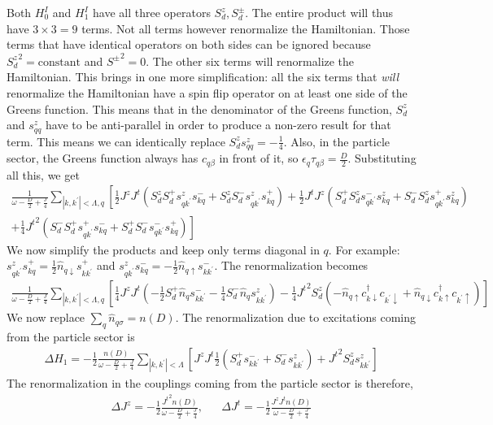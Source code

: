 \documentclass[12pt]{revtex4-2}
\begin{document}
Both \(H^I_0\) and \(H^I_1\) have all three operators \(S_d^z, S_d^\pm\). The entire product will thus have \(3\times 3 = 9\) terms. Not all terms however renormalize the Hamiltonian. Those terms that have identical operators on both sides can be ignored because \({S_d^z}^2 = \text{constant}\) and \({S^\pm}^2 = 0\). The other six terms will renormalize the Hamiltonian. This brings in one more simplification: all the six terms that \textit{will} renormalize the Hamiltonian have a spin flip operator on at least one side of the Greens function. This means that in the denominator of the Greens function, \(S_d^z\) and \(s^z_{qq}\) have to be anti-parallel in order to produce a non-zero result for that term. This means we can identically replace \(S_d^z s^z_{qq} = -\frac{1}{4}\). Also, in the particle sector, the Greens function always has \(c_{q\beta}\) in front of it, so \(\epsilon_q \tau_{q\beta} = \frac{D}{2}\). Substituting all this, we get
\begin{align}
	\frac{1}{\omega - \frac{D}{2} + \frac{J}{4}}\sum_{|k,k^\prime|<\Lambda,q}\left[\frac{1}{2}J^z J^t \left(S_d^z S_d^+ s^z_{qk^\prime}s^-_{kq} + S_d^z S_d^- s^z_{qk^\prime}s^+_{kq}\right) + \frac{1}{2}J^t J^z \left(S_d^+ S_d^z s^-_{qk^\prime}s^z_{kq} + S_d^- S_d^z s^+_{qk^\prime}s^z_{kq}\right)\right.\\
+\left.\frac{1}{4}{J^t}^2 \left(S_d^- S_d^+ s^+_{qk^\prime}s^-_{kq} + S_d^+ S_d^- s^-_{qk^\prime}s^+_{kq}\right)\right]
\end{align}
We now simplify the products and keep only terms diagonal in \(q\). For example: \(s^z_{qk^\prime}s^+_{kq} = \frac{1}{2}\hat n_{q \downarrow}s^+_{kk^\prime}\) and \(s^z_{qk^\prime}s^-_{kq} = -\frac{1}{2}\hat n_{q \uparrow}s^-_{kk^\prime}\). The renormalization becomes
\begin{align}
	\frac{1}{\omega - \frac{D}{2} + \frac{J}{4}}\sum_{|k,k^\prime|<\Lambda,q}\left[\frac{1}{4}J^z J^t \left(-\frac{1}{2}S_d^+ \hat n_{q}s^-_{kk^\prime} - \frac{1}{4}S_d^- \hat n_{q} s^z_{kk^\prime}\right) - \frac{1}{4}{J^t}^2 S_d^z\left(-\hat n_{q \uparrow}c^\dagger_{k \downarrow}c_{k^\prime \downarrow} + \hat n_{q \downarrow}c^\dagger_{k \uparrow}c_{k^\prime \uparrow}\right)\right]
\end{align}
We now replace \(\sum_q \hat n_{q\sigma} = n(D)\). The renormalization due to excitations coming from the particle sector is
\begin{align}
	\Delta H_1 = -\frac{1}{2}\frac{n(D)}{\omega - \frac{D}{2} + \frac{J}{4}}\sum_{|k,k^\prime|<\Lambda}\left[J^z J^t \frac{1}{2}\left(S_d^+ s^-_{kk^\prime} + S_d^- s^z_{kk^\prime}\right) + {J^t}^2 S_d^z s^z_{kk^\prime}\right]
\end{align}
The renormalization in the couplings coming from the particle sector is therefore,
\begin{align}
	\label{kondo_part}
	\Delta J^z = -\frac{1}{2}\frac{{J^t}^2n(D)}{\omega - \frac{D}{2} + \frac{J}{4}}, && \Delta J^t = -\frac{1}{2}\frac{J^z J^tn(D)}{\omega - \frac{D}{2} + \frac{J}{4}}
\end{align}
\end{document}
